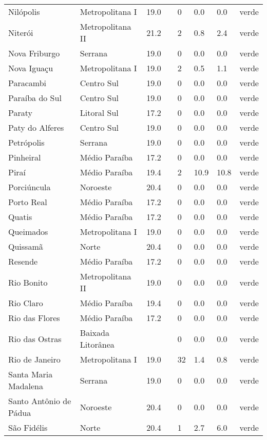 \begin{longtable}{l|lllllll}
  Nilópolis & Metropolitana I & 19.0 &  & 0 & 0.0 & 0.0 & verde \\ 
  Niterói & Metropolitana II & 21.2 &  & 2 & 0.8 & 2.4 & verde \\ 
  Nova Friburgo & Serrana & 19.0 &  & 0 & 0.0 & 0.0 & verde \\ 
  Nova Iguaçu & Metropolitana I & 19.0 &  & 2 & 0.5 & 1.1 & verde \\ 
  Paracambi & Centro Sul & 19.0 &  & 0 & 0.0 & 0.0 & verde \\ 
  Paraíba do Sul & Centro Sul & 19.0 &  & 0 & 0.0 & 0.0 & verde \\ 
  Paraty & Litoral Sul & 17.2 &  & 0 & 0.0 & 0.0 & verde \\ 
  Paty do Alferes & Centro Sul & 19.0 &  & 0 & 0.0 & 0.0 & verde \\ 
  Petrópolis & Serrana & 19.0 &  & 0 & 0.0 & 0.0 & verde \\ 
  Pinheiral & Médio Paraíba & 17.2 &  & 0 & 0.0 & 0.0 & verde \\ 
  Piraí & Médio Paraíba & 19.4 &  & 2 & 10.9 & 10.8 & verde \\ 
  Porciúncula & Noroeste & 20.4 &  & 0 & 0.0 & 0.0 & verde \\ 
  Porto Real & Médio Paraíba & 17.2 &  & 0 & 0.0 & 0.0 & verde \\ 
  Quatis & Médio Paraíba & 17.2 &  & 0 & 0.0 & 0.0 & verde \\ 
  Queimados & Metropolitana I & 19.0 &  & 0 & 0.0 & 0.0 & verde \\ 
  Quissamã & Norte & 20.4 &  & 0 & 0.0 & 0.0 & verde \\ 
  Resende & Médio Paraíba & 17.2 &  & 0 & 0.0 & 0.0 & verde \\ 
  Rio Bonito & Metropolitana II & 19.0 &  & 0 & 0.0 & 0.0 & verde \\ 
  Rio Claro & Médio Paraíba & 19.4 &  & 0 & 0.0 & 0.0 & verde \\ 
  Rio das Flores & Médio Paraíba & 17.2 &  & 0 & 0.0 & 0.0 & verde \\ 
  Rio das Ostras & Baixada Litorânea &  &  & 0 & 0.0 & 0.0 & verde \\ 
  Rio de Janeiro & Metropolitana I & 19.0 &  & 32 & 1.4 & 0.8 & verde \\ 
  Santa Maria Madalena & Serrana & 19.0 &  & 0 & 0.0 & 0.0 & verde \\ 
  Santo Antônio de Pádua & Noroeste & 20.4 &  & 0 & 0.0 & 0.0 & verde \\ 
  São Fidélis & Norte & 20.4 &  & 1 & 2.7 & 6.0 & verde \\ 

\end{longtable}
